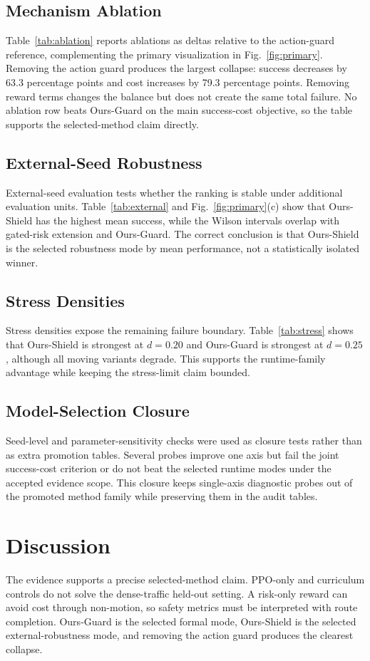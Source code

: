 \documentclass[conference,a4paper]{IEEEtran}
\begin{document}
\subsection{Mechanism Ablation}
Table~\ref{tab:ablation} reports ablations as deltas relative to the action-guard reference, complementing the primary visualization in Fig.~\ref{fig:primary}. Removing the action guard produces the largest collapse: success decreases by 63.3 percentage points and cost increases by 79.3 percentage points. Removing reward terms changes the balance but does not create the same total failure. No ablation row beats Ours-Guard on the main success-cost objective, so the table supports the selected-method claim directly.

\subsection{External-Seed Robustness}
External-seed evaluation tests whether the ranking is stable under additional evaluation units. Table~\ref{tab:external} and Fig.~\ref{fig:primary}(c) show that Ours-Shield has the highest mean success, while the Wilson intervals overlap with gated-risk extension and Ours-Guard. The correct conclusion is that Ours-Shield is the selected robustness mode by mean performance, not a statistically isolated winner.

\subsection{Stress Densities}
Stress densities expose the remaining failure boundary. Table~\ref{tab:stress} shows that Ours-Shield is strongest at $d=0.20$ and Ours-Guard is strongest at $d=0.25$, although all moving variants degrade. This supports the runtime-family advantage while keeping the stress-limit claim bounded.
\subsection{Model-Selection Closure}
Seed-level and parameter-sensitivity checks were used as closure tests rather than as extra promotion tables. Several probes improve one axis but fail the joint success-cost criterion or do not beat the selected runtime modes under the accepted evidence scope. This closure keeps single-axis diagnostic probes out of the promoted method family while preserving them in the audit tables.
\FloatBarrier
\section{Discussion}
The evidence supports a precise selected-method claim. PPO-only and curriculum controls do not solve the dense-traffic held-out setting. A risk-only reward can avoid cost through non-motion, so safety metrics must be interpreted with route completion. Ours-Guard is the selected formal mode, Ours-Shield is the selected external-robustness mode, and removing the action guard produces the clearest collapse.
\end{document}
